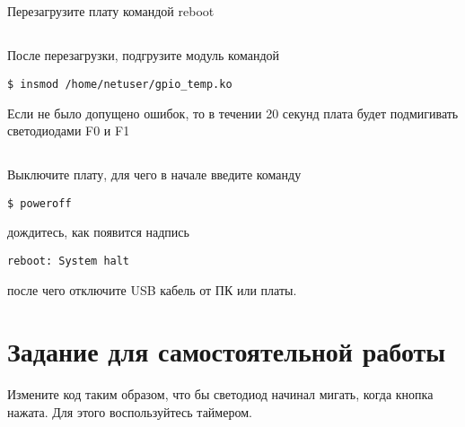 \subsection{}Перезагрузите плату командой reboot

\subsection{}После перезагрузки, подгрузите модуль командой
\begin{lstlisting}[style=bash]
$ insmod /home/netuser/gpio_temp.ko
\end{lstlisting}
Если не было допущено ошибок, то в течении 20 секунд плата будет подмигивать светодиодами F0 и F1

\subsection{} Выключите плату, для чего в начале введите команду
\begin{lstlisting}[style=bash]
	$ poweroff
\end{lstlisting}
дождитесь, как появится надпись
\begin{lstlisting}[style=stdout]
	reboot: System halt
\end{lstlisting}
после чего отключите USB кабель от ПК или платы. 

\section{Задание для самостоятельной работы}
Измените код таким образом, что бы светодиод начинал мигать, когда кнопка нажата. Для этого воспользуйтесь таймером.

